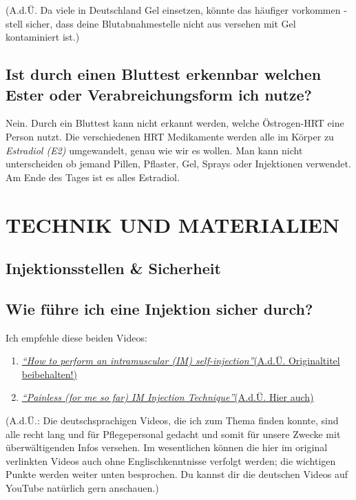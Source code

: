 \documentclass{article}
\begin{document}
(A.d.Ü. Da viele in Deutschland Gel einsetzen, könnte das häufiger vorkommen - stell sicher, dass deine Blutabnahmestelle nicht aus versehen mit Gel kontaminiert ist.)

\subsection{Ist durch einen Bluttest erkennbar welchen Ester oder Verabreichungsform ich nutze?}\label{4-16}

Nein. Durch ein Bluttest kann nicht erkannt werden, welche Östrogen-HRT eine Person nutzt. Die verschiedenen HRT Medikamente werden alle im Körper zu \textit{Estradiol (E2)} umgewandelt, genau wie wir es wollen. Man kann nicht unterscheiden ob jemand Pillen, Pflaster, Gel, Sprays oder Injektionen verwendet. Am Ende des Tages ist es alles Estradiol.

 

\section{TECHNIK UND MATERIALIEN} \label{ts}

\subsection*{Injektionsstellen \& Sicherheit}

\subsection{Wie führe ich eine Injektion sicher durch?}

Ich empfehle diese beiden Videos:

\begin{enumerate}
  \item \href{https://www.youtube.com/watch?v=cBabaGC2Dok}{\textit{“How to perform an intramuscular (IM) self-injection”}(A.d.Ü. Originaltitel beibehalten!)}
  \item \href{https://www.youtube.com/watch?v=YfNlAZLxLyw}{\textit{“Painless (for me so far) IM Injection Technique”}(A.d.Ü. Hier auch)}
\end{enumerate}

(A.d.Ü.: Die deutschsprachigen Videos, die ich zum Thema finden konnte, sind alle recht lang und für Pflegepersonal gedacht und somit für unsere Zwecke mit überwältigenden Infos versehen. Im wesentlichen können die hier im original verlinkten Videos auch ohne Englischkenntnisse verfolgt werden; die wichtigen Punkte werden weiter unten besprochen. Du kannst dir die deutschen Videos auf YouTube natürlich gern anschauen.) 
\end{document}
